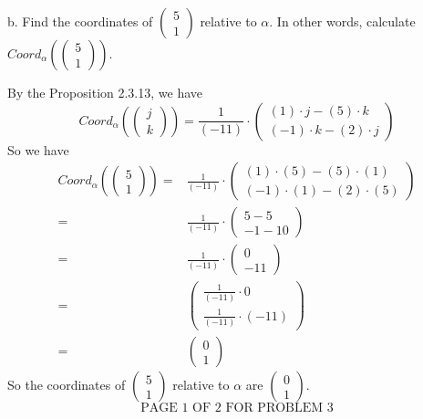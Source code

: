 \documentclass[12pt]{article}
\newenvironment{problem}[2][Problem]
{
	\begin{trivlist} 
		\item[\hskip \labelsep {\bfseries #1 #2:}]
	}
{
	\end{trivlist}
	}
\newenvironment{solution}[1][Solution]
{
	\begin{trivlist} 
		\item[\hskip \labelsep {\itshape #1:}]
	}
	{
	\end{trivlist}
}
\begin{document}
\begin{problem}{3}
\begin{solution}
\end{solution}
\noindent
\newline
\newline
b. Find the coordinates of $\begin{pmatrix}5 \\ 1 \end{pmatrix}$ relative to $\alpha$. In other words, calculate $Coord_{\alpha}\left(  \begin{pmatrix}5 \\ 1 \end{pmatrix} \right)$.
\begin{solution}
By the Proposition 2.3.13, we have 
\[
Coord_{\alpha}\left(\begin{pmatrix}j\\k\end{pmatrix}\right) = \frac{1}{(-11)} \cdot \begin{pmatrix}(1)\cdot j-(5)\cdot k\\(-1) \cdot k-(2) \cdot j\end{pmatrix}
\]
So we have
\begin{align*}
Coord_{\alpha}\left(  \begin{pmatrix}5 \\ 1 \end{pmatrix} \right) =& \frac{1}{(-11)} \cdot \begin{pmatrix}(1)\cdot (5)-(5)\cdot (1)\\(-1) \cdot (1)-(2) \cdot (5)\end{pmatrix}\\
=& \frac{1}{(-11)} \cdot \begin{pmatrix}5-5\\-1-10\end{pmatrix}\\
=& \frac{1}{(-11)} \cdot \begin{pmatrix}0\\-11\end{pmatrix}\\
=& \begin{pmatrix} \frac{1}{(-11)} \cdot 0\\ \frac{1}{(-11)} \cdot (-11)\end{pmatrix}\\
=& \begin{pmatrix}0\\1\end{pmatrix}
\end{align*}
So the coordinates of $\begin{pmatrix}5 \\ 1 \end{pmatrix}$ relative to $\alpha$ are $\begin{pmatrix}0\\1\end{pmatrix}$.
\[
\text{PAGE 1 OF 2 FOR PROBLEM 3}
\]
\end{solution}
\end{problem}
\end{document}
